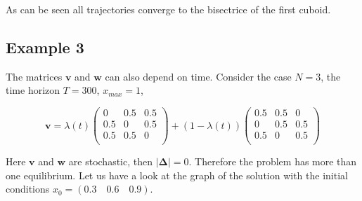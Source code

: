 \documentclass[a4paper,10pt, english]{article}
\begin{document}
As can be seen all trajectories converge to the bisectrice of the first cuboid.
\subsection{Example 3}
The matrices $\mathbf{v}$ and $\mathbf{w}$ can also depend on time. Consider the case $N=3$, the time horizon $T = 300$, $x_{max} = 1$,



$$
\mathbf{v} = 
 \lambda(t)\left(
 \begin{array}{ccc}
0 & 0.5 & 0.5 \\
0.5 & 0 & 0.5 \\
0.5 & 0.5 & 0 \\
\end{array} 
\right) 
+ (1-\lambda(t))
\left( 
\begin{array}{ccc}
0.5 & 0.5 & 0 \\
0 & 0.5 & 0.5 \\
0.5 & 0 & 0.5 \\
\end{array} 
\right)
$$


Here $\mathbf{v}$ and $\mathbf{w}$ are stochastic, then $|\mathbf{\Delta}| = 0$. Therefore the problem has more than one equilibrium. 
Let us have a look at the graph of the solution with the initial conditions $x_0 = (0.3\quad 0.6\quad 0.9)$.
\end{document}
